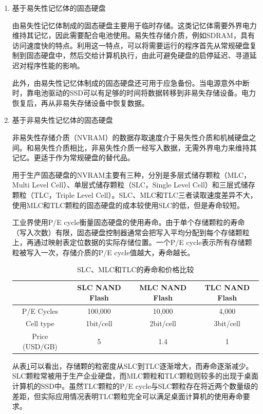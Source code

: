 \begin{enumerate}
\item 基于易失性记忆体的固态硬盘

由易失性记忆体制成的固态硬盘主要用于临时存储。这类记忆体需要外界电力维持其记忆，因此需要配合电池使用。易失性存储介质，例如SDRAM，具有访问速度快的特点。利用这一特点，可以将需要运行的程序首先从常规硬盘复制到固态硬盘中，然后交给计算机执行，由此可避免硬盘的启停延迟、寻道延迟对程序性能的影响。

此外，由易失性记忆体制成的固态硬盘还可用于应急备份。当电源意外中断时，靠电池驱动的SSD可以有足够的时间将数据转移到非易失存储设备。电力恢复后，再从非易失存储设备中恢复数据。

\item 基于非易失性记忆体的固态硬盘

非易失性存储介质（NVRAM）的数据存取速度介于易失性介质和机械硬盘之间。和易失性介质相比，非易失性介质一经写入数据，无需外界电力来维持其记忆。更适于作为常规硬盘的替代品。

用于生产固态硬盘的NVRAM主要有三种，分別是多层式储存颗粒（MLC，Multi Level Cell）、单层式储存颗粒（SLC，Single Level Cell）和三层式储存颗粒（TLC，Triple Level Cell）。SLC、MLC和TLC三者读取速度差异不大，使用MLC和TLC颗粒的固态硬盘的成本较使用SLC的低，但是寿命较短。

工业界使用P/E cycle衡量固态硬盘的使用寿命。由于单个存储颗粒的寿命（写入次数）有限，固态硬盘控制器通常会把写入平均分配到每个存储颗粒上，再通过映射表定位数据的实际存储位置。一个P/E cycle表示所有存储颗粒被写入一次，存储介质的P/E cycle值越大，寿命越长。

\begin{table}[htb]
\centering
\caption{SLC、MLC和TLC的寿命和价格比较}
\begin{tabular}{|c|c|c|c|}
\hline  & SLC NAND Flash & MLC NAND Flash & TLC NAND Flash \\
\hline P/E Cycles & 100,000 & 10,000 & 4,000 \\
\hline Cell type & 1bit/cell & 2bit/cell & 3bit/cell \\
\hline Price (USD/GB) & 5 & 1.4 & 1 \\
\hline
\end{tabular}
\label{tab:slc-mlc-tlc-compare}
\end{table}

从表\ref{tab:slc-mlc-tlc-compare}可以看出，存储颗的粒密度从SLC到TLC逐渐增大，而寿命逐渐减少。SLC颗粒常被用于生产企业硬盘，而MLC颗粒和TLC颗粒则较多的出现于桌面计算机的SSD中。虽然TLC颗粒的P/E cycle与SLC颗粒存在将近两个数量级的差距，但实际应用情况表明TLC颗粒完全可以满足桌面计算机的使用寿命要求。


\end{enumerate}
